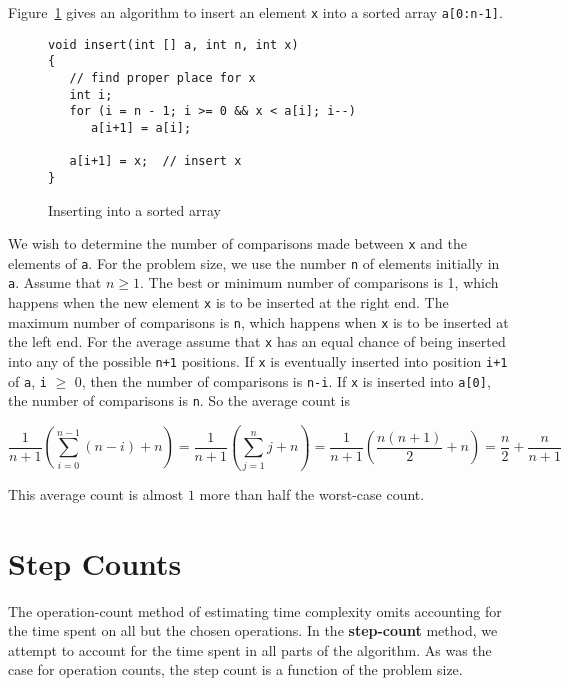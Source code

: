 \begin{example}
\label{E2:insert} 
Figure~\ref{prog2:insert} gives an algorithm to
insert an element {\tt x} into a sorted array
{\tt a[0:n-1]}.

\begin{figure}
\begin{verbatim}
void insert(int [] a, int n, int x)
{
   // find proper place for x
   int i;
   for (i = n - 1; i >= 0 && x < a[i]; i--)
      a[i+1] = a[i];

   a[i+1] = x;  // insert x
}
\end{verbatim}
\caption{Inserting into a sorted array
\label{prog2:insert}}
\end{figure}

 
We wish to determine the number of comparisons made between {\tt x} and the
elements of {\tt a}.  For the problem size, we use the number
{\tt n} of elements initially in {\tt a}.
Assume that $n \geq 1$.
The best or minimum number of comparisons is 1, which happens
when the new element {\tt x} is to be inserted at the right end.
The maximum number of comparisons is {\tt n}, which happens
when {\tt x} is to be inserted at the left end.
For the average assume that {\tt x} has an equal
chance of being inserted into any of the possible {\tt n+1} positions.
If {\tt x} is eventually inserted into position {\tt i+1} of {\tt a},
{\tt i} $\geq$ 0, then the
number of comparisons is {\tt n-i}.
If {\tt x} is inserted into {\tt a[0]}, the
number of comparisons is {\tt n}.  So the average count is
%


$$\frac{1}{n+1} ( \sum_{i = 0}^{n - 1} (n - i) + n ) =
\frac{1}{n+1} ( \sum_{j = 1}^n j  + n )
 = \frac{1}{n+1} (\frac{n(n+1)}{2} + n)
 = \frac{n}{2} + \frac{n}{n+1}$$

This average count is almost $1$ more than half the worst-case count.
\end{example}


\section
{Step Counts}
The operation-count method
of estimating time complexity omits accounting for the time spent on all
but the chosen operations.  In the {\bf step-count} method, we attempt to
account for the time spent in all parts of the algorithm.
As was the case for operation counts,
the step count
is a function of the
problem size.
 
